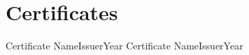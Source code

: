 \section{Certif{}icates}
    \resumeSubHeadingListStart
        \resumeCertificateHeading
            {Certificate Name}{Issuer}{Year}
        \resumeCertificateHeading
            {Certificate Name}{Issuer}{Year}
    \resumeSubHeadingListEnd
    \vspace{-4pt}